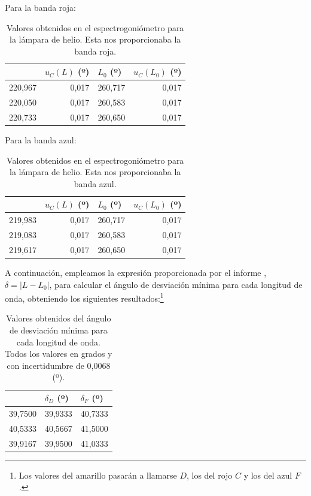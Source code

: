 \documentclass[10pt,onecolumn]{article}
\begin{document}
Para la banda roja:
\begin{table}[htbp]
\centering
\begin{tabular}{|r|r|r|r|}
\hline
\rowcolor[rgb]{ .651,  .788,  .925}
\multicolumn{1}{|l|}{$L$ (º)} & \multicolumn{1}{l|}{$u_C(L)$ (º)} & \multicolumn{1}{l|}{$L_0$ (º)} & \multicolumn{1}{l|}{$u_C(L_0)$ (º)} \\ \hline
\rowcolor[rgb]{.816,  .816,  .816}220,967 & 0,017 & 260,717 & 0,017 \\ \hline
\rowcolor[rgb]{.816,  .816,  .816}220,050 & 0,017 & 260,583 & 0,017 \\ \hline
\rowcolor[rgb]{.816,  .816,  .816}220,733 & 0,017 & 260,650 & 0,017 \\ \hline
\end{tabular}
\caption{Valores obtenidos en el espectrogoniómetro para la lámpara de helio. Esta nos proporcionaba la banda roja.}\label{tab:banda_roja}
\end{table}

Para la banda azul:
\begin{table}[H]
\centering
\begin{tabular}{|r|r|r|r|}
\hline
\rowcolor[rgb]{ .651,  .788,  .925}
\multicolumn{1}{|l|}{$L$ (º)} & \multicolumn{1}{l|}{$u_C(L)$ (º)} & \multicolumn{1}{l|}{$L_0$ (º)} & \multicolumn{1}{l|}{$u_C(L_0)$ (º)} \\ \hline
\rowcolor[rgb]{.816,  .816,  .816} 219,983 & 0,017 & 260,717 & 0,017 \\ \hline
\rowcolor[rgb]{.816,  .816,  .816} 219,083 & 0,017 & 260,583 & 0,017 \\ \hline
\rowcolor[rgb]{.816,  .816,  .816} 219,617 & 0,017 & 260,650 & 0,017 \\ \hline
\end{tabular}
\caption{Valores obtenidos en el espectrogoniómetro para la lámpara de helio. Esta nos proporcionaba la banda azul.}\label{tab:banda_azul}
\end{table}

A continuación, empleamos la expresión proporcionada por el informe \cite{InfoOpticaPrisma}, $\delta = |L - L_0|$, para calcular el ángulo de desviación mínima para cada longitud de onda, obteniendo los siguientes resultados:\footnote{Los valores del amarillo pasarán a llamarse $D$, los del rojo $C$ y los del azul $F$.}
\begin{table}[H]
\centering
\begin{tabular}{|r|r|r|}
\hline
\rowcolor[rgb]{ .651,  .788,  .925}
\multicolumn{1}{|l|}{$\delta_C$ (º)} & \multicolumn{1}{l|}{$\delta_D$ (º)} & \multicolumn{1}{l|}{$\delta_F$ (º)} \\ \hline
\rowcolor[rgb]{.816,  .816,  .816}  39,7500 & 39,9333 & 40,7333 \\ \hline
\rowcolor[rgb]{.816,  .816,  .816} 40,5333  & 40,5667 & 41,5000 \\ \hline
\rowcolor[rgb]{.816,  .816,  .816} 39,9167& 39,9500  & 41,0333 \\ \hline
\end{tabular}
\caption{Valores obtenidos del ángulo de desviación mínima para cada longitud de onda. Todos los valores en grados y con incertidumbre de 0,0068 (º).}\label{tab:delta}
\end{table}
\end{document}

